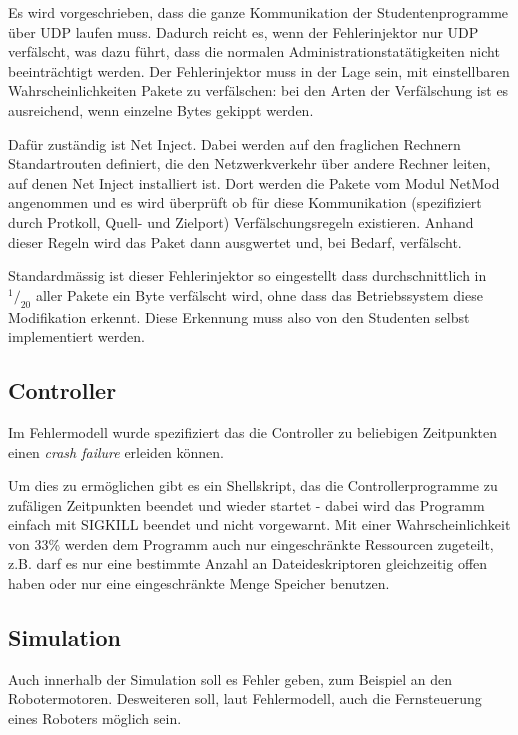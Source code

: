 Es wird vorgeschrieben, dass die ganze Kommunikation der Studentenprogramme {\"{u}}ber UDP laufen muss. Dadurch reicht es, wenn der Fehlerinjektor nur UDP verf{\"{a}}lscht, was dazu
f{\"{u}}hrt, dass die normalen Administrationstat{\"{a}}tigkeiten nicht beeintr{\"{a}}chtigt werden. Der Fehlerinjektor muss in der Lage sein, mit einstellbaren Wahrscheinlichkeiten
Pakete zu verf{\"{a}}lschen: bei den Arten der Verf{\"{a}}lschung ist es ausreichend, wenn einzelne Bytes gekippt werden.

Daf{\"{u}}r zust{\"{a}}ndig ist Net Inject\cite{kubertzki}. Dabei werden auf den fraglichen Rechnern
Standartrouten definiert, die den Netzwerkverkehr {\"{u}}ber andere Rechner leiten, auf denen Net Inject
installiert ist. Dort werden die Pakete vom Modul NetMod angenommen und es wird {\"{u}}berpr{\"{u}}ft ob
f{\"{u}}r diese Kommunikation (spezifiziert durch Protkoll, Quell- und Zielport) Verf{\"{a}}lschungsregeln
existieren. Anhand dieser Regeln wird das Paket dann ausgwertet und, bei Bedarf, verf{\"{a}}lscht.

Standardm{\"{a}}ssig ist dieser Fehlerinjektor so eingestellt dass durchschnittlich in $ ^1/_{20} $ aller Pakete ein Byte verf{\"{a}}lscht wird,
ohne dass das Betriebssystem diese Modifikation erkennt. Diese Erkennung muss also von den Studenten selbst implementiert werden.

\subsection{Controller}
Im Fehlermodell wurde spezifiziert das die Controller zu beliebigen Zeitpunkten einen \textit{crash failure} erleiden k{\"{o}}nnen.

Um dies zu erm{\"{o}}glichen gibt es ein Shellskript, das die Controllerprogramme zu zuf{\"{a}}ligen Zeitpunkten beendet und wieder startet - dabei wird das Programm einfach mit SIGKILL beendet und nicht vorgewarnt.
Mit einer Wahrscheinlichkeit von 33\% werden dem Programm auch nur eingeschr{\"{a}}nkte Ressourcen zugeteilt, z.B. darf es nur eine bestimmte Anzahl an Dateideskriptoren gleichzeitig
offen haben oder nur eine eingeschr{\"{a}}nkte Menge Speicher benutzen.


\subsection{Simulation}
Auch innerhalb der Simulation soll es Fehler geben, zum Beispiel an den Robotermotoren. Desweiteren soll,
laut Fehlermodell, auch die Fernsteuerung eines Roboters m{\"{o}}glich sein.

